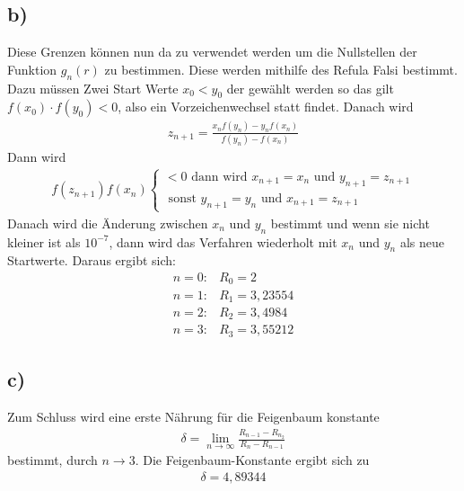 \subsection*{b)}
	Diese Grenzen können nun da zu verwendet werden um die Nullstellen der Funktion $g_n(r)$ zu bestimmen.
	Diese werden mithilfe des Refula Falsi bestimmt.
	Dazu müssen Zwei Start Werte $x_0<y_0$ der gewählt werden so das gilt $f(x_0)\cdot f(y_0)< 0$, also ein Vorzeichenwechsel statt findet. 
	Danach wird 
	\begin{align*}
		z_{n+1}=\frac{x_nf(y_n)-y_nf(x_n)}{f(y_n)-f(x_n)}
	\end{align*}
	Dann wird 
	\begin{align*}
	f(z_{n+1})f(x_n)\begin{cases}
		<0 \text{ dann wird } x_{n+1}=x_n\text{ und } y_{n+1}=z_{n+1}\\
		\text{ sonst }y_{n+1}=y_n\text{ und } x_{n+1}=z_{n+1}
	\end{cases}
	\end{align*}
	Danach wird die Änderung zwischen $x_n$ und $y_n$ bestimmt und wenn sie nicht kleiner ist als $10^{-7}$, dann wird das Verfahren wiederholt mit $x_n$ und $y_n$ als neue Startwerte.
	Daraus ergibt sich:
	\begin{align*}
	n=0:& R_0=2\\
	n=1:& R_1=3,23554\\
	n=2:& R_2=3,4984\\
	n=3:& R_3=3,55212
	\end{align*}
	\subsection*{c)}
	Zum Schluss wird eine erste Nährung für die Feigenbaum konstante 
	\begin{align*}
		\delta = \lim\limits_{n\to\infty}\frac{R_{n-1}-R_{n_2}}{R_{n}-R_{n-1}}
	\end{align*}
	bestimmt, durch $n\to3$.
	Die Feigenbaum-Konstante ergibt sich zu
	\begin{align*}
		\delta = 4,89344
	\end{align*} 
	
